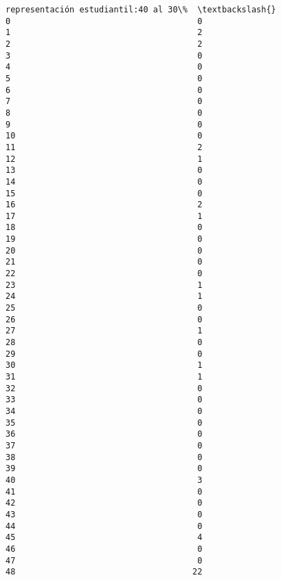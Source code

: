 \documentclass[11pt]{article}
\begin{document}
\begin{Verbatim}[commandchars=\\\{\}]
    representación estudiantil:40 al 30\%  \textbackslash{}
0                                      0   
1                                      2   
2                                      2   
3                                      0   
4                                      0   
5                                      0   
6                                      0   
7                                      0   
8                                      0   
9                                      0   
10                                     0   
11                                     2   
12                                     1   
13                                     0   
14                                     0   
15                                     0   
16                                     2   
17                                     1   
18                                     0   
19                                     0   
20                                     0   
21                                     0   
22                                     0   
23                                     1   
24                                     1   
25                                     0   
26                                     0   
27                                     1   
28                                     0   
29                                     0   
30                                     1   
31                                     1   
32                                     0   
33                                     0   
34                                     0   
35                                     0   
36                                     0   
37                                     0   
38                                     0   
39                                     0   
40                                     3   
41                                     0   
42                                     0   
43                                     0   
44                                     0   
45                                     4   
46                                     0   
47                                     0   
48                                    22   


\end{Verbatim}
\end{document}
